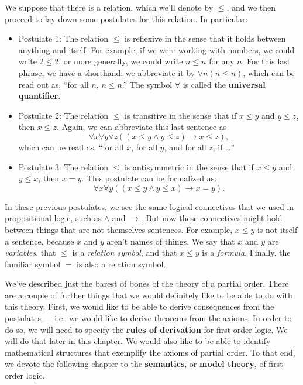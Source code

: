 \begin{example} \label{ex:poset} We
  suppose that there is a relation, which we'll denote by $\leq$, and
  we then proceed to lay down some postulates for this relation.  In
  particular:
\begin{itemize}
\item Postulate 1: The relation $\leq$ is reflexive in the sense that
  it holds between anything and itself.  For example, if we were
  working with numbers, we could write $2\leq 2$, or more generally,
  we could write $n\leq n$ for any $n$.  For this last phrase, we have
  a shorthand: we abbreviate it by $\forall n(n\leq n)$, which can be
  read out as, ``for all $n$, $n\leq n$.''  The symbol $\forall$ is
  called the \textbf{universal quantifier}.
\item Postulate 2: The relation $\leq$  is transitive in the sense
  that if $x\leq y$ and $y\leq z$, then $x\leq z$.  Again, we can
  abbreviate this last sentence as
  \[ \forall x\forall y\forall z((x\leq y\wedge y\leq z)\to x\leq z)
    ,\]
  which can be read as, ``for all $x$, for all $y$, and for all $z$,
  if \dots ''
\item Postulate 3: The relation $\leq$ is antisymmetric in the sense
  that if $x\leq y$ and $y\leq x$, then $x=y$.  This postulate can be
  formalized as:
    \[ \forall x\forall y((x\leq y\wedge y\leq x)\to x=y) .\]
  \end{itemize}
  In these previous postulates, we see the same logical connectives
  that we used in propositional logic, such as $\wedge$ and $\to$.
  But now these connectives might hold between things that are not
  themselves sentences.  For example, $x\leq y$ is not itself a
  sentence, because $x$ and $y$ aren't names of things.  We say that
  $x$ and $y$ are \emph{variables}, that $\leq$ is a \emph{relation
    symbol}, and that $x\leq y$ is a \emph{formula}.  Finally, the
  familiar symbol $=$ is also a relation symbol. \end{example}

We've described just the barest of bones of the theory of a partial
order.  There are a couple of further things that we would definitely
like to be able to do with this theory.  First, we would like to be
able to derive consequences from the postulates --- i.e.\ we would
like to derive theorems from the axioms.  In order to do so, we will
need to specify the \textbf{rules of derivation} for first-order
logic.  We will do that later in this chapter.  We would also like to
be able to identify mathematical structures that exemplify the axioms
of partial order.  To that end, we devote the following chapter to the
\textbf{semantics}, or \textbf{model theory}, of first-order logic.

